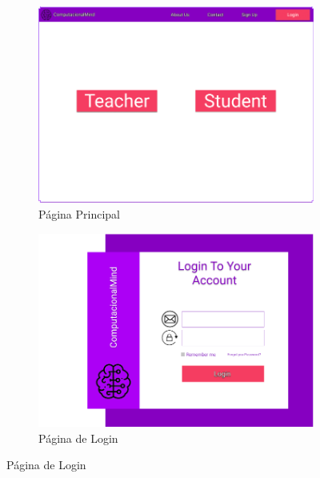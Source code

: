 \documentclass[11pt,a4paper]{report}
\begin{document}
\begin{figure}
     \centering
     \begin{subfigure}[h!]{0.4\textwidth}
         \centering
         \includegraphics[width=\textwidth]{MockHome.png}
         \caption{Página Principal}
         \label{fig:MockHome}
     \end{subfigure}
     \hfill
     \begin{subfigure}[h!]{0.4\textwidth}
         \centering
         \includegraphics[width=\textwidth]{MockLogin.png}
         \caption{Página de Login}
         \label{fig:MockLogin}
     \end{subfigure}
\end{figure}
\end{document}
